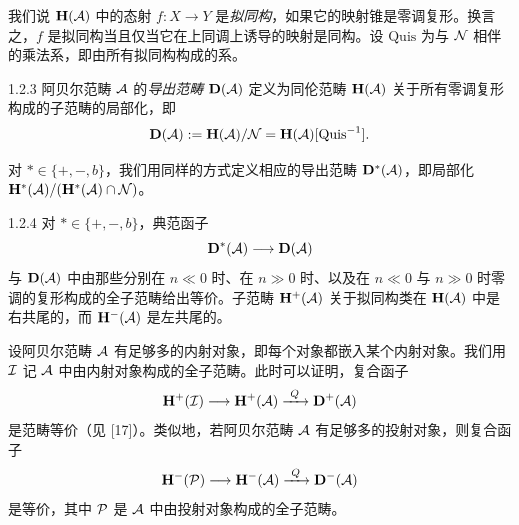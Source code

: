 我们说 $\mathbf{H}(\mathcal{A})$ 中的态射 $f:X\to Y$ 是\emph{拟同构}，如果它的映射锥是零调复形。换言之，$f$ 是拟同构当且仅当它在上同调上诱导的映射是同构。设 $\mathrm{Quis}$ 为与 $\mathcal{N}$ 相伴的乘法系，即由所有拟同构构成的系。

\begin{definition}{1.2.3}
阿贝尔范畴 $\mathcal{A}$ 的\emph{导出范畴} $\mathbf{D}(\mathcal{A})$ 定义为同伦范畴 $\mathbf{H}(\mathcal{A})$ 关于所有零调复形构成的子范畴的局部化，即
\begin{equation*}
\mathbf{D}(\mathcal{A}):=\mathbf{H}(\mathcal{A})/\mathcal{N}=\mathbf{H}(\mathcal{A})[\mathrm{Quis}^{-1}].
\end{equation*}
\end{definition}

对 $\ast\in\{+,-,b\}$，我们用同样的方式定义相应的导出范畴 $\mathbf{D}^{\ast}(\mathcal{A})$，即局部化 $\mathbf{H}^{\ast}(\mathcal{A})/(\mathbf{H}^{\ast}(\mathcal{A})\cap\mathcal{N})$。

\begin{lemma}{1.2.4}
对 $\ast\in\{+,-,b\}$，典范函子
\begin{equation*}
\mathbf{D}^{\ast}(\mathcal{A})\longrightarrow\mathbf{D}(\mathcal{A})
\end{equation*}
与 $\mathbf{D}(\mathcal{A})$ 中由那些分别在 $n\ll 0$ 时、在 $n\gg 0$ 时、以及在 $n\ll 0$ 与 $n\gg 0$ 时零调的复形构成的全子范畴给出等价。子范畴 $\mathbf{H}^{+}(\mathcal{A})$ 关于拟同构类在 $\mathbf{H}(\mathcal{A})$ 中是右共尾的，而 $\mathbf{H}^{-}(\mathcal{A})$ 是左共尾的。
\end{lemma}


设阿贝尔范畴 $\mathcal{A}$ 有足够多的内射对象，即每个对象都嵌入某个内射对象。我们用 $\mathcal{I}$ 记 $\mathcal{A}$ 中由内射对象构成的全子范畴。此时可以证明，复合函子
\begin{equation*}
\mathbf{H}^{+}(\cI)\longrightarrow\mathbf{H}^{+}(\cA)\xrightarrow{\ Q\ }\mathbf{D}^{+}(\cA)
\end{equation*}
是范畴等价（见 [17]）。类似地，若阿贝尔范畴 $\mathcal{A}$ 有足够多的投射对象，则复合函子
\begin{equation*}
\mathbf{H}^{-}(\cP)\longrightarrow\mathbf{H}^{-}(\cA)\xrightarrow{\ Q\ }\mathbf{D}^{-}(\cA)
\end{equation*}
是等价，其中 $\mathcal{P}$ 是 $\mathcal{A}$ 中由投射对象构成的全子范畴。

